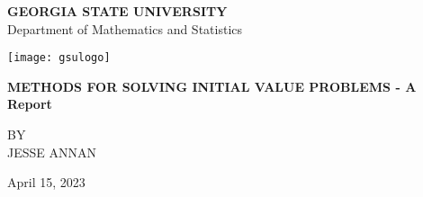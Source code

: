 \onehalfspacing

\begin{titlepage}
	\begin{center}
		
		\LARGE
		\textbf{GEORGIA STATE UNIVERSITY} \\
		Department of Mathematics and Statistics
		
		\vspace{0.35in}
		
		\texttt{[image: gsulogo]}
		
		\vspace{0.5in}
		
		\textbf{METHODS FOR SOLVING INITIAL VALUE PROBLEMS - A Report}
		
		\vspace{0.8in}
		
		\large
		BY \\ \vspace{0.2in}
		JESSE ANNAN 
		
		\vspace{0.5in}
		April 15, 2023
		
	\end{center}
\end{titlepage}